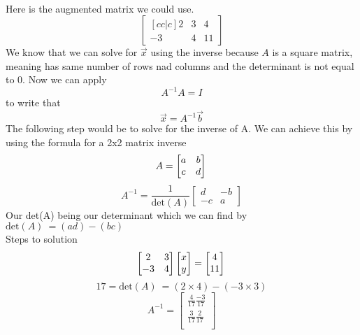 \documentclass[12pt]{article}
\begin{document}
\\ Here is the augmented matrix we could use.
\[\begin{bmatrix}[cc|c]
2 & 3 & 4\\
-3 & 4 & 11
\end{bmatrix}
\]
We know that we can solve for $\vec{x}$ using the inverse because $A$ is a square matrix, meaning has same number of rows nad columns and the determinant is not equal to 0. Now we can apply 
\begin{equation*}
A^{-1}A=I 
\end{equation*}
to write that
\begin{equation*}
\vec{x}=A^{-1} \vec{b}
\end{equation*}
The following step would be to solve for the inverse of A. We can achieve this by using the formula for a 2x2 matrix inverse
\begin{equation*}
A = \begin{bmatrix}
  a & b \\
  c & d
\end{bmatrix}\\\\
\end{equation*}
\begin{equation*}
A^{-1}=\frac{1}{\text{det}(A)}\begin{bmatrix}
  d & -b \\
  -c & a
\end{bmatrix}
\end{equation*}
Our det(A) being our determinant which we can find by 
$\text{det}(A)\ = (ad) - (bc)$\\
Steps to solution
\begin{equation*}
  \begin{bmatrix}
    2 & 3 \\
    -3 & 4
  \end{bmatrix} \begin{bmatrix}
    x \\
    y
  \end{bmatrix}
  = \begin{bmatrix}
    4 \\
    11
  \end{bmatrix} \\
  \end{equation*}
  \begin{equation*}
17 = \text{det}(A)\ = (2\times 4) - (-3\times 3)
\end{equation*}
\begin{equation*}
A^{-1} = \begin{bmatrix}
\frac{4}{17} \frac{-3}{17} \\
\frac{3}{17} \frac{2}{17} \\
\end{bmatrix}
\end{equation*}
\end{document}
